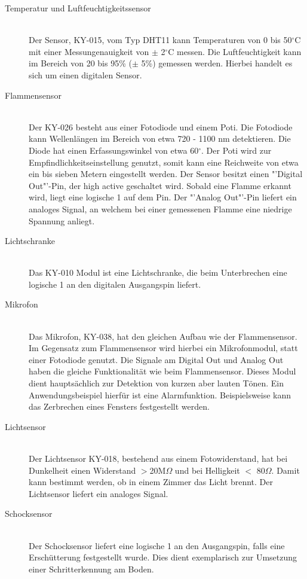 \begin{description}
\item[Temperatur und Luftfeuchtigkeitssensor] \hfill \\
	Der Sensor, KY-015, vom Typ DHT11 kann Temperaturen von 0 bis 50$^\circ$C mit einer Messungenauigkeit von $\pm$ 2$^\circ$C messen. Die Luftfeuchtigkeit kann im Bereich von 20 bis 95\% ($\pm$ 5\%) gemessen werden. Hierbei handelt es sich um einen digitalen Sensor.  
\item[Flammensensor]\hfill \\
	Der KY-026 besteht aus einer Fotodiode und einem \ac{Poti}. Die Fotodiode kann Wellenlängen im Bereich von etwa 720 - 1100 nm detektieren. Die Diode hat einen Erfassungswinkel von etwa 60$^\circ$. Der \ac{Poti} wird zur Empfindlichkeitseinstellung genutzt, somit kann eine Reichweite von etwa  ein bis sieben Metern eingestellt werden. Der Sensor besitzt einen "'Digital Out"'-Pin, der high active geschaltet wird. Sobald eine Flamme erkannt wird, liegt eine logische 1 auf dem Pin. Der "'Analog Out"'-Pin liefert ein analoges Signal, an welchem bei einer gemessenen Flamme eine niedrige Spannung anliegt.
\item[Lichtschranke]\hfill \\
	Das KY-010 Modul ist eine Lichtschranke, die beim Unterbrechen eine logische 1 an den digitalen Ausgangspin liefert.
\item[Mikrofon]\hfill \\
	Das Mikrofon, KY-038, hat den gleichen Aufbau wie der Flammensensor. Im Gegensatz zum Flammensensor wird hierbei ein Mikrofonmodul, statt einer Fotodiode genutzt. Die Signale am Digital Out und Analog Out haben die gleiche Funktionalität wie beim Flammensensor. Dieses Modul dient hauptsächlich zur Detektion von kurzen aber lauten Tönen. Ein Anwendungsbeispiel hierfür ist eine Alarmfunktion. Beispielsweise kann das Zerbrechen eines Fensters festgestellt werden.
\item[Lichtsensor]\hfill \\
	Der Lichtsensor KY-018, bestehend aus einem Fotowiderstand, hat bei Dunkelheit einen Widerstand $>$20M$\Omega$ und bei Helligkeit $<$ 80$\Omega$. Damit kann bestimmt werden, ob in einem Zimmer das Licht brennt. Der Lichtsensor liefert ein analoges Signal.
\item[Schocksensor]\hfill \\
	Der Schocksensor liefert eine logische 1 an den Ausgangspin, falls eine Erschütterung festgestellt wurde. Dies dient exemplarisch zur Umsetzung einer Schritterkennung am Boden.
\end{description}


